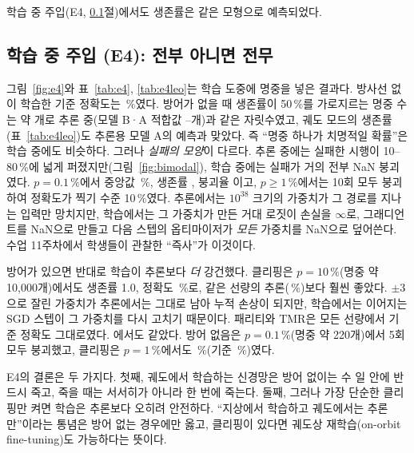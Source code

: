 학습 중 주입(E4, \ref{sec:e4}절)에서도 생존률은 같은 모형으로 예측되었다.

\subsection{학습 중 주입 (E4): 전부 아니면 전무}
\label{sec:e4}
그림~\ref{fig:e4}와 표~\ref{tab:e4}, \ref{tab:e4leo}는 학습 도중에 명중을 넣은 결과다. 방사선 없이 학습한 기준 정확도는 \EfourCtrl{}\,\%였다. 방어가 없을 때 생존률이 50\,\%를 가로지르는 명중 수는 약 \EfourKfiftyNone{}개로 추론 중(모델 B·A 적합값 \KfiftyBNoneLinear{}--\KfiftyALinear{}개)과 같은 자릿수였고, 궤도 모드의 생존률(표~\ref{tab:e4leo})도 추론용 모델 A의 예측과 맞았다. 즉 ``명중 하나가 치명적일 확률''은 학습 중에도 비슷하다. 그러나 \emph{실패의 모양}이 다르다. 추론 중에는 실패한 시행이 10--80\,\%에 넓게 퍼졌지만(그림~\ref{fig:bimodal}), 학습 중에는 실패가 거의 전부 NaN 붕괴였다. $p=0.1\,\%$에서 중앙값 \EfourOneEmThreeNoneMed{}\,\%, 생존률 \EfourOneEmThreeNoneSurv{}, 붕괴율 \EfourOneEmThreeNoneCrash{}이고, $p\ge1\,\%$에서는 10회 모두 붕괴하여 정확도가 찍기 수준 10\,\%였다. 추론에서는 $10^{38}$ 크기의 가중치가 그 경로를 지나는 입력만 망치지만, 학습에서는 그 가중치가 만든 거대 로짓이 손실을 $\infty$로, 그래디언트를 NaN으로 만들고 다음 스텝의 옵티마이저가 \emph{모든} 가중치를 NaN으로 덮어쓴다. 수업 11주차에서 학생들이 관찰한 ``즉사''가 이것이다.

방어가 있으면 반대로 학습이 추론보다 \emph{더} 강건했다. 클리핑은 $p=10\,\%$(명중 약 10{,}000개)에서도 생존률 1.0, 정확도 \EfourOneEmOneClipMed{}\,\%로, 같은 선량의 추론(\pOneEmOneClipMed{}\,\%)보다 훨씬 좋았다. $\pm3$으로 잘린 가중치가 추론에서는 그대로 남아 누적 손상이 되지만, 학습에서는 이어지는 SGD 스텝이 그 가중치를 다시 고치기 때문이다. 패리티와 TMR은 모든 선량에서 기준 정확도 그대로였다. 에서도 같았다. 방어 없음은 $p=0.1\,\%$(명중 약 220개)에서 5회 모두 붕괴했고, 클리핑은 $p=1\,\%$에서도 \EfourCnnOneEmTwoClipMed{}\,\%(기준 \EfourCnnCtrl{}\,\%)였다.

E4의 결론은 두 가지다. 첫째, 궤도에서 학습하는 신경망은 방어 없이는 수 일 안에 반드시 죽고, 죽을 때는 서서히가 아니라 한 번에 죽는다. 둘째, 그러나 가장 단순한 클리핑만 켜면 학습은 추론보다 오히려 안전하다. ``지상에서 학습하고 궤도에서는 추론만''이라는 통념은 방어 없는 경우에만 옳고, 클리핑이 있다면 궤도상 재학습(on-orbit fine-tuning)도 가능하다는 뜻이다.

